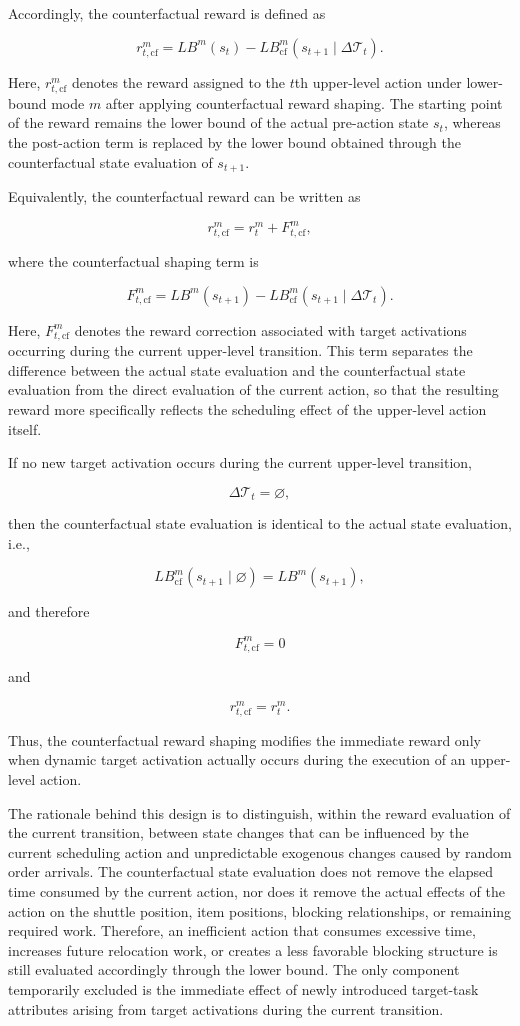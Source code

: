 Accordingly, the counterfactual reward is defined as

\[
r_{t,\mathrm{cf}}^m
=
LB^m(s_t)
-
LB_{\mathrm{cf}}^m
\left(
s_{t+1}\mid\Delta\mathcal{T}_t
\right).
\]

Here, $r_{t,\mathrm{cf}}^m$ denotes the reward assigned to the $t$th upper-level action under lower-bound mode $m$ after applying counterfactual reward shaping. The starting point of the reward remains the lower bound of the actual pre-action state $s_t$, whereas the post-action term is replaced by the lower bound obtained through the counterfactual state evaluation of $s_{t+1}$.

Equivalently, the counterfactual reward can be written as

\[
r_{t,\mathrm{cf}}^m
=
r_t^m
+
F_{t,\mathrm{cf}}^m,
\]

where the counterfactual shaping term is

\[
F_{t,\mathrm{cf}}^m
=
LB^m(s_{t+1})
-
LB_{\mathrm{cf}}^m
\left(
s_{t+1}\mid\Delta\mathcal{T}_t
\right).
\]

Here, $F_{t,\mathrm{cf}}^m$ denotes the reward correction associated with target activations occurring during the current upper-level transition. This term separates the difference between the actual state evaluation and the counterfactual state evaluation from the direct evaluation of the current action, so that the resulting reward more specifically reflects the scheduling effect of the upper-level action itself.

If no new target activation occurs during the current upper-level transition,

\[
\Delta\mathcal{T}_t=\varnothing,
\]

then the counterfactual state evaluation is identical to the actual state evaluation, i.e.,

\[
LB_{\mathrm{cf}}^m
\left(
s_{t+1}\mid\varnothing
\right)
=
LB^m(s_{t+1}),
\]

and therefore

\[
F_{t,\mathrm{cf}}^m=0
\]

and

\[
r_{t,\mathrm{cf}}^m=r_t^m.
\]

Thus, the counterfactual reward shaping modifies the immediate reward only when dynamic target activation actually occurs during the execution of an upper-level action.

The rationale behind this design is to distinguish, within the reward evaluation of the current transition, between state changes that can be influenced by the current scheduling action and unpredictable exogenous changes caused by random order arrivals. The counterfactual state evaluation does not remove the elapsed time consumed by the current action, nor does it remove the actual effects of the action on the shuttle position, item positions, blocking relationships, or remaining required work. Therefore, an inefficient action that consumes excessive time, increases future relocation work, or creates a less favorable blocking structure is still evaluated accordingly through the lower bound. The only component temporarily excluded is the immediate effect of newly introduced target-task attributes arising from target activations during the current transition.

